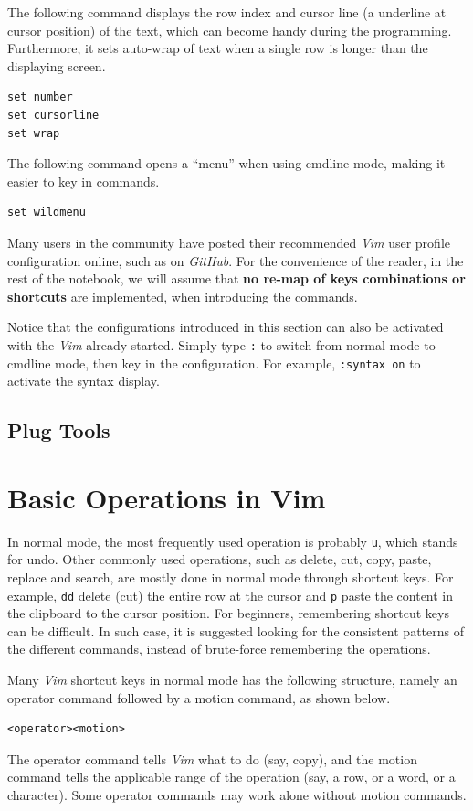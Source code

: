 The following command displays the row index and cursor line (a underline at cursor position) of the text, which can become handy during the programming. Furthermore, it sets auto-wrap of text when a single row is longer than the displaying screen.
\begin{verbatim}
set number
set cursorline
set wrap
\end{verbatim}

The following command opens a ``menu'' when using cmdline mode, making it easier to key in commands.
\begin{verbatim}
set wildmenu
\end{verbatim}

Many users in the community have posted their recommended \textit{Vim} user profile configuration online, such as on \textit{GitHub}. For the convenience of the reader, in the rest of the notebook, we will assume that \textbf{no re-map of keys combinations or shortcuts} are implemented, when introducing the commands.

Notice that the configurations introduced in this section can also be activated with the \textit{Vim} already started. Simply type \verb|:| to switch from normal mode to cmdline mode, then key in the configuration. For example, \verb|:syntax on| to activate the syntax display.

\subsection{Plug Tools}

\section{Basic Operations in Vim}

In normal mode, the most frequently used operation is probably \verb|u|, which stands for undo. Other commonly used operations, such as delete, cut, copy, paste, replace and search, are mostly done in normal mode through shortcut keys. For example, \verb|dd| delete (cut) the entire row at the cursor and \verb|p| paste the content in the clipboard to the cursor position. For beginners, remembering shortcut keys can be difficult. In such case, it is suggested looking for the consistent patterns of the different commands, instead of brute-force remembering the operations.

Many \textit{Vim} shortcut keys in normal mode has the following structure, namely an operator command followed by a motion command, as shown below.
\begin{verbatim}
<operator><motion>
\end{verbatim}
The operator command tells \textit{Vim} what to do (say, copy), and the motion command tells the applicable range of the operation (say, a row, or a word, or a character). Some operator commands may work alone without motion commands.

